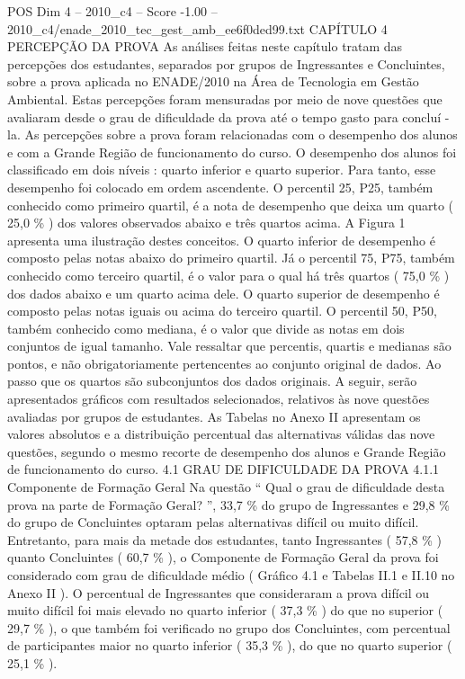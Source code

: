 \begin{textsample}{POS Dim 4 – 2010\_c4 – Score -1.00 – 2010\_c4/enade\_2010\_tec\_gest\_amb\_ee6f0ded99.txt}  \label{ex:f4_pos_297}
CAPÍTULO 4 PERCEPÇÃO DA PROVA As análises feitas neste capítulo tratam das percepções dos estudantes, separados por grupos de Ingressantes e Concluintes, sobre a prova aplicada no ENADE/2010 na Área de Tecnologia em Gestão Ambiental.
Estas percepções foram mensuradas por meio de nove questões que avaliaram desde o grau de dificuldade da prova até o tempo gasto para concluí -la.
As percepções sobre a prova foram relacionadas com o desempenho dos alunos e com a Grande Região de funcionamento do curso.
O desempenho dos alunos foi classificado em dois níveis : quarto inferior e quarto superior.
Para tanto, esse desempenho foi colocado em ordem ascendente.
O percentil 25, P25, também conhecido como primeiro quartil, é a nota de desempenho que deixa um quarto ( 25,0 \% ) dos valores observados abaixo e três quartos acima.
A Figura 1 apresenta uma ilustração destes conceitos.
O quarto inferior de desempenho é composto pelas notas abaixo do primeiro quartil.
Já o percentil 75, P75, também conhecido como terceiro quartil, é o valor para o qual há três quartos ( 75,0 \% ) dos dados abaixo e um quarto acima dele.
O quarto superior de desempenho é composto pelas notas iguais ou acima do terceiro quartil.
O percentil 50, P50, também conhecido como mediana, é o valor que divide as notas em dois conjuntos de igual tamanho.
Vale ressaltar que percentis, quartis e medianas são pontos, e não obrigatoriamente pertencentes ao conjunto original de dados.
Ao passo que os quartos são subconjuntos dos dados originais.
A seguir, serão apresentados gráficos com resultados selecionados, relativos às nove questões avaliadas por grupos de estudantes.
As Tabelas no Anexo II apresentam os valores absolutos e a distribuição percentual das alternativas válidas das nove questões, segundo o mesmo recorte de desempenho dos alunos e Grande Região de funcionamento do curso. 4.1 GRAU DE DIFICULDADE DA PROVA 4.1.1 Componente de Formação Geral Na questão “ Qual o grau de dificuldade desta prova na parte de Formação Geral? ”, 33,7 \% do grupo de Ingressantes e 29,8 \% do grupo de Concluintes optaram pelas alternativas difícil ou muito difícil.
Entretanto, para mais da metade dos estudantes, tanto Ingressantes ( 57,8 \% ) quanto Concluintes ( 60,7 \% ), o Componente de Formação Geral da prova foi considerado com grau de dificuldade médio ( Gráfico 4.1 e Tabelas II.1 e II.10 no Anexo II ).
O percentual de Ingressantes que consideraram a prova difícil ou muito difícil foi mais elevado no quarto inferior ( 37,3 \% ) do que no superior ( 29,7 \% ), o que também foi verificado no grupo dos Concluintes, com percentual de participantes maior no quarto inferior ( 35,3 \% ), do que no quarto superior ( 25,1 \% ).

\end{textsample}
